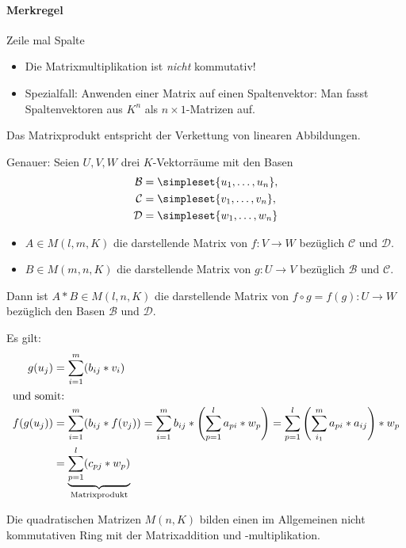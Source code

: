 \paragraph{Merkregel} Zeile mal Spalte

\bemerkung
\begin{itemize}
	\item Die Matrixmultiplikation ist \emph{nicht} kommutativ!
	\item Spezialfall: Anwenden einer Matrix auf einen Spaltenvektor: Man fasst Spaltenvektoren aus $K^n$ als $n\times 1$-Matrizen auf.
\end{itemize}

\begin{satz}{}
	Das Matrixprodukt entspricht der Verkettung von linearen Abbildungen.
\end{satz}
Genauer: Seien $U,V,W$ drei $K$-Vektorräume mit den Basen
\begin{align*}
	\mathcal{B}&=\simpleset{u_1,\ldots, u_n},\\
	\mathcal{C}&=\simpleset{v_1,\ldots, v_n},\\
	\mathcal{D}&=\simpleset{w_1,\ldots, w_n}
\end{align*}

\begin{itemize}
	\item $A\in M(l,m,K)$ die darstellende Matrix von $f:V\rightarrow W$ bezüglich $\mathcal{C}$ und $\mathcal{D}$.
	\item $B\in M(m,n,K)$ die darstellende Matrix von $g:U\rightarrow V$ bezüglich $\mathcal{B}$ und $\mathcal{C}$.
\end{itemize}
Dann ist $A*B\in M(l,n,K)$ die darstellende Matrix von $f\circ g = f(g):U\rightarrow W$ bezüglich den Basen $\mathcal{B}$ und $\mathcal{D}$.

\beweis
Es gilt:
\begin{align*}
	g(u_j)&=\sum\limits_{i=1}^m ( b_{ij} * v_i )\\
	\intertext{und somit:}
	f(g(u_j)) &= \sum\limits_{i=1}^m ( b_{ij} * f(v_j) ) = \sum\limits_{i=1}^m b_{ij} * \left( \sum\limits_{p=1}^l a_{pi} * w_p \right) =\sum\limits_{p=1}^l \left( \sum\limits_{i_1}^m a_{pi}*a_{ij} \right) * w_p\\
	&= \underbrace{\sum\limits_{p=1}^l (c_{pj} * w_p)}_\text{Matrixprodukt}
\end{align*}


Die quadratischen Matrizen $M(n,K)$ bilden einen im Allgemeinen nicht kommutativen Ring mit der Matrixaddition und -multiplikation.

